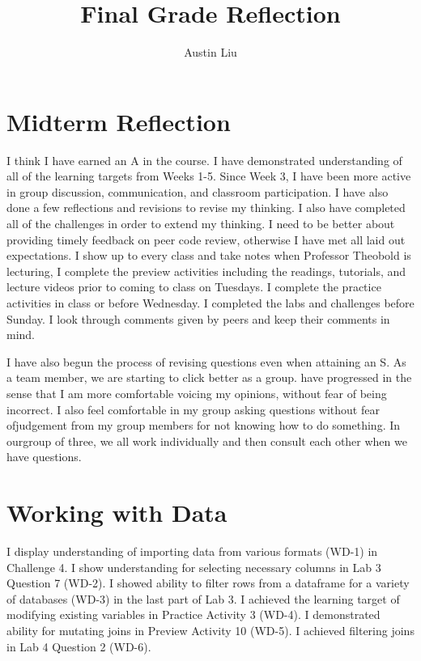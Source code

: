 \documentclass[
  letterpaper,
  DIV=11,
  numbers=noendperiod]{scrartcl}
\title{Final Grade Reflection}
\author{Austin Liu}
\date{}
\begin{document}
\maketitle
\ifdefined\Shaded\renewenvironment{Shaded}{\begin{tcolorbox}[boxrule=0pt, sharp corners, borderline west={3pt}{0pt}{shadecolor}, enhanced, frame hidden, interior hidden, breakable]}{\end{tcolorbox}}\fi

\hypertarget{midterm-reflection}{%
\section{Midterm Reflection}\label{midterm-reflection}}

I think I have earned an A in the course. I have demonstrated
understanding of all of the learning targets from Weeks 1-5. Since Week
3, I have been more active in group discussion, communication, and
classroom participation. I have also done a few reflections and
revisions to revise my thinking. I also have completed all of the
challenges in order to extend my thinking. I need to be better about
providing timely feedback on peer code review, otherwise I have met all
laid out expectations. I show up to every class and take notes when
Professor Theobold is lecturing, I complete the preview activities
including the readings, tutorials, and lecture videos prior to coming to
class on Tuesdays. I complete the practice activities in class or before
Wednesday. I completed the labs and challenges before Sunday. I look
through comments given by peers and keep their comments in mind.

I have also begun the process of revising questions even when attaining
an S. As a team member, we are starting to click better as a group. have
progressed in the sense that I am more comfortable voicing my opinions,
without fear of being incorrect. I also feel comfortable in my group
asking questions without fear ofjudgement from my group members for not
knowing how to do something. In ourgroup of three, we all work
individually and then consult each other when we have questions.

\hypertarget{working-with-data}{%
\section{Working with Data}\label{working-with-data}}

I display understanding of importing data from various formats (WD-1) in
Challenge 4. I show understanding for selecting necessary columns in Lab
3 Question 7 (WD-2). I showed ability to filter rows from a dataframe
for a variety of databases (WD-3) in the last part of Lab 3. I achieved
the learning target of modifying existing variables in Practice Activity
3 (WD-4). I demonstrated ability for mutating joins in Preview Activity
10 (WD-5). I achieved filtering joins in Lab 4 Question 2 (WD-6).
\end{document}
